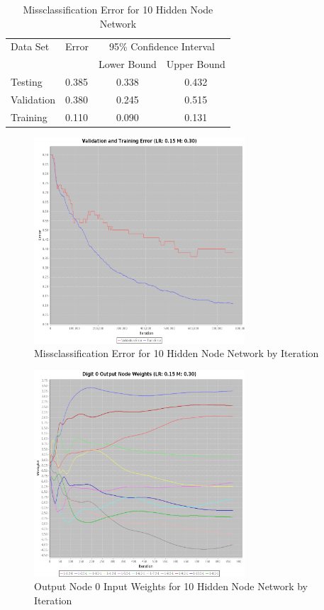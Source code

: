\documentclass{article}
\begin{document}
\begin{table}
\caption{Missclassification Error for 10 Hidden Node Network}
\begin{center}
\begin{tabular}{llcc}
\toprule
Data Set & Error & \multicolumn{2}{c}{95\% Confidence Interval} \\
\cmidrule(r){3-4}
& & Lower Bound & Upper Bound \\
\midrule
Testing       & 0.385 &  0.338 & 0.432  \\
Validation    & 0.380 &  0.245 & 0.515  \\
Training      & 0.110 &  0.090 & 0.131  \\
\bottomrule
\end{tabular}
\label{table10}
\end{center}
\end{table}

\begin{figure}
\centering
\includegraphics[width=0.7\textwidth]{data/final/10_hidden_nodes_error.png}
\caption{Missclassification Error for 10 Hidden Node Network by Iteration}
\label{error10}
\end{figure}

\begin{figure}
\centering
\includegraphics[width=0.7\textwidth]{data/final/10_hidden_nodes.png}
\caption{Output Node 0 Input Weights for 10 Hidden Node Network by Iteration}
\label{weight10}
\end{figure}
\end{document}
